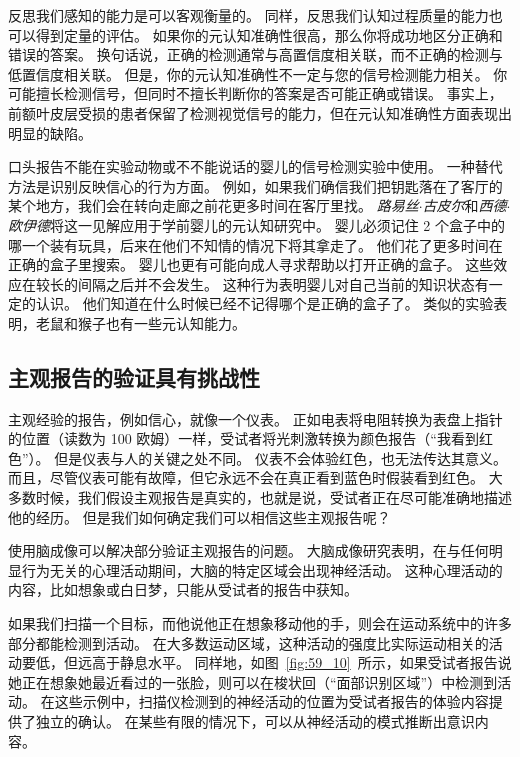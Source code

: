 反思我们感知的能力是可以客观衡量的。
同样，反思我们认知过程质量的能力也可以得到定量的评估。
如果你的元认知准确性很高，那么你将成功地区分正确和错误的答案。
换句话说，正确的检测通常与高置信度相关联，而不正确的检测与低置信度相关联。
但是，你的元认知准确性不一定与您的信号检测能力相关。
你可能擅长检测信号，但同时不擅长判断你的答案是否可能正确或错误。
事实上，前额叶皮层受损的患者保留了检测视觉信号的能力，但在元认知准确性方面表现出明显的缺陷。


口头报告不能在实验动物或不不能说话的婴儿的信号检测实验中使用。
一种替代方法是识别反映信心的行为方面。
例如，如果我们确信我们把钥匙落在了客厅的某个地方，我们会在转向走廊之前花更多时间在客厅里找。
\textit{路易丝$\cdot$古皮尔}和\textit{西德$\cdot$欧伊德}将这一见解应用于学前婴儿的元认知研究中。
婴儿必须记住 2 个盒子中的哪一个装有玩具，后来在他们不知情的情况下将其拿走了。
他们花了更多时间在正确的盒子里搜索。
婴儿也更有可能向成人寻求帮助以打开正确的盒子。
这些效应在较长的间隔之后并不会发生。
这种行为表明婴儿对自己当前的知识状态有一定的认识。
他们知道在什么时候已经不记得哪个是正确的盒子了。
类似的实验表明，老鼠和猴子也有一些元认知能力。



\subsection{主观报告的验证具有挑战性}

主观经验的报告，例如信心，就像一个仪表。
正如电表将电阻转换为表盘上指针的位置（读数为 100 欧姆）一样，受试者将光刺激转换为颜色报告（“我看到红色”）。
但是仪表与人的关键之处不同。
仪表不会体验红色，也无法传达其意义。
而且，尽管仪表可能有故障，但它永远不会在真正看到蓝色时假装看到红色。
大多数时候，我们假设主观报告是真实的，也就是说，受试者正在尽可能准确地描述他的经历。
但是我们如何确定我们可以相信这些主观报告呢？


使用脑成像可以解决部分验证主观报告的问题。
大脑成像研究表明，在与任何明显行为无关的心理活动期间，大脑的特定区域会出现神经活动。
这种心理活动的内容，比如想象或白日梦，只能从受试者的报告中获知。


如果我们扫描一个目标，而他说他正在想象移动他的手，则会在运动系统中的许多部分都能检测到活动。
在大多数运动区域，这种活动的强度比实际运动相关的活动要低，但远高于静息水平。
同样地，如图~\ref{fig:59_10}~所示，如果受试者报告说她正在想象她最近看过的一张脸，则可以在梭状回（“面部识别区域”）中检测到活动。
在这些示例中，扫描仪检测到的神经活动的位置为受试者报告的体验内容提供了独立的确认。
在某些有限的情况下，可以从神经活动的模式推断出意识内容。


